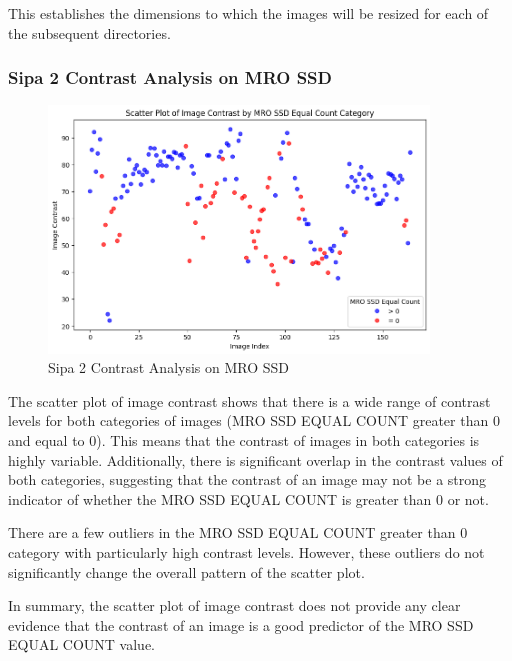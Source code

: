 This establishes the dimensions to which the images will be resized for each of the subsequent directories.


\newpage

\subsubsection{Sipa 2 Contrast Analysis on MRO SSD}

\begin{figure}[ht]
    \centering
    \includegraphics[width=0.9\textwidth]{Figures/Results/sipa_02/contrast.png}
    \caption[Sipa 2 Contrast Analysis on MRO SSD]{Sipa 2 Contrast Analysis on MRO SSD}
    \label{fig:Sipa 2 Contrast Analysis on MRO SSD}
\end{figure}

The scatter plot of image contrast shows that there is a wide range of contrast levels for both categories of images (MRO SSD EQUAL COUNT greater than 0 and equal to 0). This means that the contrast of images in both categories is highly variable. Additionally, there is significant overlap in the contrast values of both categories, suggesting that the contrast of an image may not be a strong indicator of whether the MRO SSD EQUAL COUNT is greater than 0 or not.

There are a few outliers in the MRO SSD EQUAL COUNT greater than 0 category with particularly high contrast levels. However, these outliers do not significantly change the overall pattern of the scatter plot.

In summary, the scatter plot of image contrast does not provide any clear evidence that the contrast of an image is a good predictor of the MRO SSD EQUAL COUNT value.

\newpage

